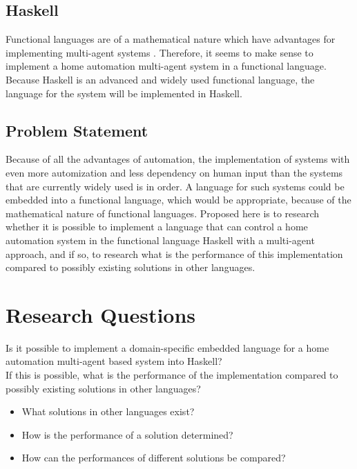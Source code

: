\documentclass{sig-alternate-br}
\begin{document}
\subsection{Haskell}
Functional languages are of a mathematical nature which have advantages for implementing multi-agent systems \cite{dif}. Therefore, it seems to make sense to implement a home automation multi-agent system in a functional language. Because Haskell is an advanced and widely used functional language, the language for the system will be implemented in Haskell.
\subsection{Problem Statement}
Because of all the advantages of automation, the implementation of systems with even more automization and less dependency on human input than the systems that are currently widely used is in order. A language for such systems could be embedded into a functional language, which would be appropriate, because of the mathematical nature of functional languages. Proposed here is to research whether it is possible to implement a language that can control a home automation system in the functional language Haskell with a multi-agent approach, and if so, to research what is the performance of this implementation compared to possibly existing solutions in other languages.

\section{Research Questions}
Is it possible to implement a domain-specific embedded language for a home automation multi-agent based system into Haskell?
\\If this is possible, what is the performance of the implementation compared to possibly existing solutions in other languages?
\begin{itemize}
\item What solutions in other languages exist?
\item How is the performance of a solution determined?
\item How can the performances of different solutions be compared?
\end{itemize}
\end{document}
